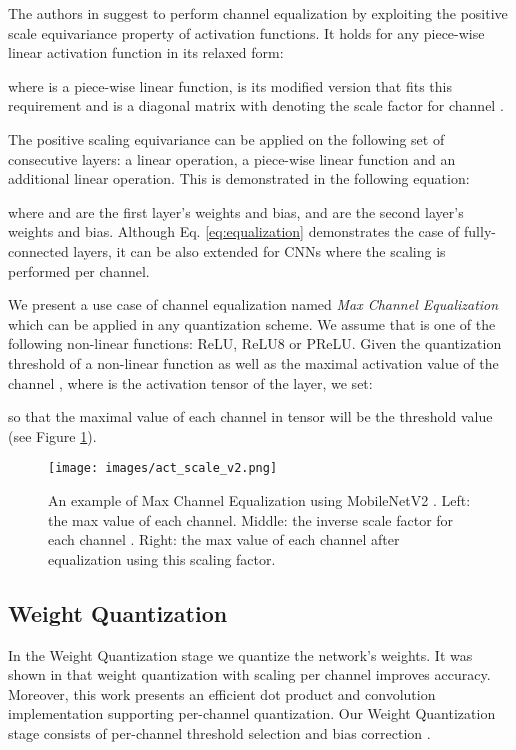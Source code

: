 \documentclass{article}
\newcommand{\mbvtwo}{MobileNetV2 \cite{sandler2018mobilenetv2} }
\begin{document}
The authors in \cite{nagel2019data, meller2019same} suggest to perform channel equalization by exploiting the positive scale equivariance property of activation functions. 
It holds for any piece-wise linear activation function in its relaxed form:

where  is a piece-wise linear function,  is its modified version that fits this requirement and  is a diagonal matrix with  denoting the scale factor for channel .

The positive scaling equivariance can be applied on the following set of consecutive layers: a linear operation, a piece-wise linear function  and an additional linear operation. This is demonstrated in the following equation:

where  and  are the first layer's weights and bias,  and  are the second layer's  weights and bias. Although Eq. \ref{eq:equalization}  demonstrates the case of fully-connected layers, it can be also extended for CNNs where the scaling is performed per channel.

We present a use case of channel equalization named \textit{Max Channel Equalization} which can be applied in any quantization scheme.
We assume that  is one of the following non-linear functions: ReLU, ReLU8 or PReLU. Given the quantization threshold  of a non-linear function as well as the maximal activation value of the  channel  , where  is the activation tensor of the  layer, we set:

so that the maximal value of each channel in tensor  will be the threshold value (see Figure \ref{fig:channels_corr}).




\begin{figure}[H]
    \centering
    \texttt{[image: images/act\_scale\_v2.png]}
    \caption{
    An example of Max Channel Equalization using \mbvtwo. 
    Left: the max value  of each channel.
    Middle: the inverse scale factor  for each channel .
    Right: the max value of each channel after equalization using this scaling factor.
    }
    \label{fig:channels_corr}
\end{figure}



\subsection{Weight Quantization}
In the Weight Quantization stage we quantize the network's weights.
It was shown in \cite{krishnamoorthi2018quantizing,rastegari2016xnor} that weight quantization with scaling per channel improves accuracy.
Moreover, this work presents an efficient dot product and convolution implementation supporting per-channel quantization. 
Our Weight Quantization stage consists of per-channel threshold selection and bias correction \cite{nagel2019data}.
\end{document}
